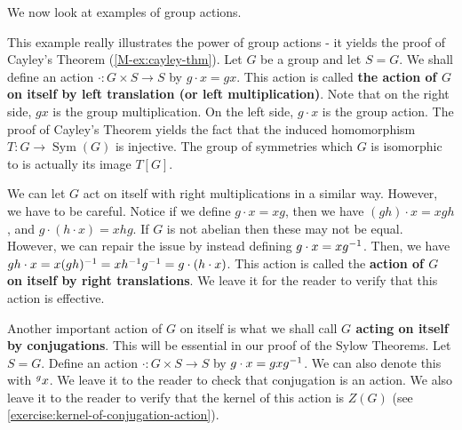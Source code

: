 \documentclass[./main.tex]{subfiles}
\begin{document}
We now look at examples of group actions. 

\begin{example}
\label{example:action-left-translations}
    This example really illustrates the power of group actions - it yields the
    proof of Cayley's Theorem (\cref{M-ex:cayley-thm}). Let $G$ be a group and let
    $S = G$. We shall define an action $\cdot: G \times S \to S$ by $g \cdot x =
    gx$. This action is called \textbf{the action of $G$ on itself by left
    translation (or left multiplication)}. Note that on the right side, $gx$ is
    the group multiplication. On the left side, $g \cdot x$ is the group action.
    The proof of Cayley's Theorem yields the fact that the induced homomorphism
    $T: G \to \operatorname{Sym}(G)$ is injective. The group of symmetries which
    $G$ is isomorphic to is actually its image $T[G]$.
\end{example}

\begin{example}
\label{example:action-right-translations}
    We can let $G$ act on itself with right multiplications in a similar way.
    However, we have to be careful. Notice if we define $g \cdot x = xg$, then
    we have $(gh) \cdot x = xgh$, and $g \cdot (h \cdot x) = xhg$. If $G$ is not
    abelian then these may not be equal. However, we can repair the issue by
    instead defining $g \cdot x = x g^{-1}$. Then, we have $gh \cdot x =
    x(gh)^{-1} = x h^{-1} g^{-1} = g \cdot (h \cdot x)$. This action is called the
    \textbf{action of $G$ on itself by right translations}. We leave it for the
    reader to verify that this action is effective.
\end{example}

\begin{example}
\label{example:action-conjugations}
    Another important action of $G$ on itself is what we shall call \textbf{$G$
    acting on itself by conjugations}. This will be essential in our proof of
    the Sylow Theorems. Let $S = G$. Define an action $\cdot: G \times S \to S$
    by $g \cdot x = gxg^{-1}$. We can also denote this with $\prescript{g}{}{x}$.
    We leave it to the reader to check that conjugation is an action. We also
    leave it to the reader to verify that the kernel of this action is $Z(G)$
    (see \cref{exercise:kernel-of-conjugation-action}).
    
\end{example}
\end{document}
